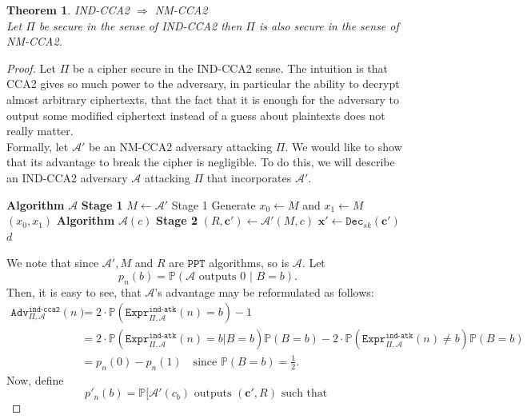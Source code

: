 \documentclass{article}
\newtheorem{theorem}{Theorem}[section]
\theoremstyle{definition}
\theoremstyle{example}
\newcommand{\Dec}{\texttt{Dec}}
\newcommand{\A}{\mathcal{A}}
\newcommand{\Prob}{\mathbb{P}}
\newcommand{\PPT}{\texttt{PPT}}
\newcommand{\Expr}[2]{\texttt{Expr}^{\texttt{#1}}_{#2}}
\newcommand{\Adv}[2]{\texttt{Adv}^{\texttt{#1}}_{#2}}
\renewcommand{\vec}[1]{\mathbf{#1}}
\begin{document}
\begin{theorem}{IND-CCA2 $\Rightarrow$ NM-CCA2}\\
  Let $\Pi$ be secure in the sense of IND-CCA2 then $\Pi$ is also secure in the
  sense of NM-CCA2.
\end{theorem}
\begin{proof}
  Let $\Pi$ be a cipher secure in the IND-CCA2 sense. The intuition is that CCA2
  gives so much power to the adversary, in particular the ability to decrypt
  almost arbitrary ciphertexts, that the fact that it is enough for the
  adversary to output some modified ciphertext instead of a guess about
  plaintexts does not really matter.\\
  Formally, let $\A'$ be an NM-CCA2 adversary attacking $\Pi$. We would like to
  show that its advantage to break the cipher is negligible. To do this, we will
  describe an IND-CCA2 adversary $\A$ attacking $\Pi$ that incorporates $\A'$.\\
  \begin{algorithmic}
    \State \textbf{Algorithm} $\A$ \textbf{Stage 1}
    \State $M \leftarrow \A'$ Stage 1
    \State Generate $x_0 \leftarrow M$ and $x_1 \leftarrow M$
    \State \Return $(x_0, x_1)$
    \State
    \State \textbf{Algorithm} $\A(c)$ \textbf{Stage 2}
    \State $(R, \vec{c}') \leftarrow \A'(M, c)$
    \State $\vec{x}' \leftarrow \Dec_{sk}(\vec{c}')$
    \If{$c \not\in \vec{c}'$ and $\perp \not\in \vec{x}'$ and $R(x_0,
      \vec{x}') = True$}{ $d = 0$} \EndIf
    \State \Return $d$
    \State
  \end{algorithmic}
  We note that since $\A', M$ and $R$ are $\PPT$ algorithms, so is $\A$. Let
  \[
    p_n(b) = \Prob(\A \text{ outputs } 0 \,\, | \,\, B = b).
  \]
  Then, it is easy to see, that $\A$'s advantage may be reformulated as follows:
  \begin{equation}
    \begin{split}
      \label{eq:indcca2eqnmcca2}
    \Adv{ind-cca2}{\Pi, \A}(n) &= 2\cdot\Prob(\Expr{ind-atk}{\Pi, \A}(n) = b)
    - 1 \\
                               &= 2\cdot\Prob(\Expr{ind-atk}{\Pi, \A}(n) = b | B = b)\Prob(B = b)
    - 2\cdot\Prob(\Expr{ind-atk}{\Pi, \A}(n) \neq b)\Prob(B = b) \\
                               &= p_n(0) - p_n(1)\quad\text{since } \Prob(B = b) = \frac12.
     \end{split}
  \end{equation}
  Now, define
  \[
    p'_n(b) = \Prob[\A'(c_b) \text{ outputs } (\vec{c}', R) \text{ such that }
\]
\end{proof}
\end{document}
